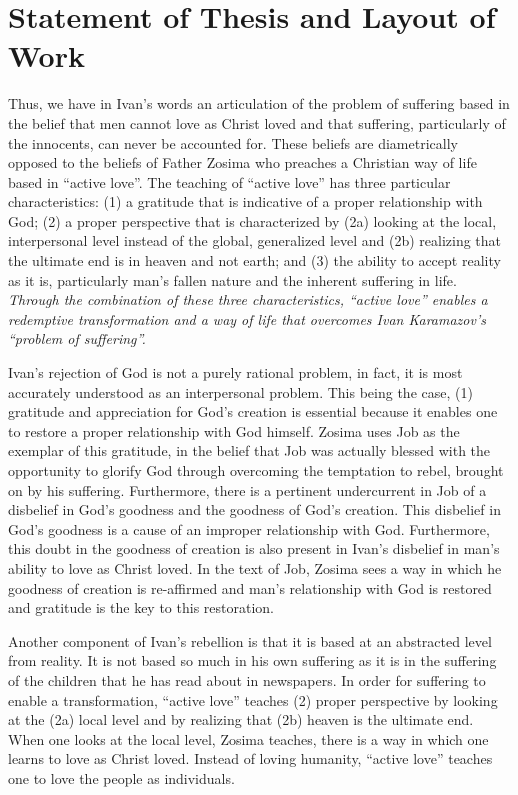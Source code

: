 \section{Statement of Thesis and Layout of Work}

Thus, we have in Ivan's words an articulation of the problem of suffering based in the belief that men cannot love as Christ loved and that suffering, particularly of the innocents, can never be accounted for. These beliefs are diametrically opposed to the beliefs of Father Zosima who preaches a Christian way of life based in ``active love''. The teaching of ``active love'' has three particular characteristics: (1) a gratitude that is indicative of a proper relationship with God; (2) a proper perspective that is characterized by (2a) looking at the local, interpersonal level instead of the global, generalized level and (2b) realizing that the ultimate end is in heaven and not earth; and (3) the ability to accept reality as it is, particularly man's fallen nature and the inherent suffering in life. \emph{Through the combination of these three characteristics, ``active love'' enables a redemptive transformation and a way of life that overcomes Ivan Karamazov's ``problem of suffering''.}

Ivan's rejection of God is not a purely rational problem, in fact, it is most accurately understood as an interpersonal problem. This being the case, (1) gratitude and appreciation for God's creation is essential because it enables one to restore a proper relationship with God himself. Zosima uses Job as the exemplar of this gratitude, in the belief that Job was actually blessed with the opportunity to glorify God through overcoming the temptation to rebel, brought on by his suffering. Furthermore, there is a pertinent undercurrent in Job of a disbelief in God's goodness and the goodness of God's creation. This disbelief in God's goodness is a cause of an improper relationship with God. Furthermore, this doubt in the goodness of creation is also present in Ivan's disbelief in man's ability to love as Christ loved. In the text of Job, Zosima sees a way in which he goodness of creation is re-affirmed and man's relationship with God is restored and gratitude is the key to this restoration.

Another component of Ivan's rebellion is that it is based at an abstracted level from reality. It is not based so much in his own suffering as it is in the suffering of the children that he has read about in newspapers. In order for suffering to enable a transformation, ``active love'' teaches (2) proper perspective by looking at the (2a) local level and by realizing that (2b) heaven is the ultimate end. When one looks at the local level, Zosima teaches, there is a way in which one learns to love as Christ loved. Instead of loving humanity, ``active love'' teaches one to love the people as individuals.

